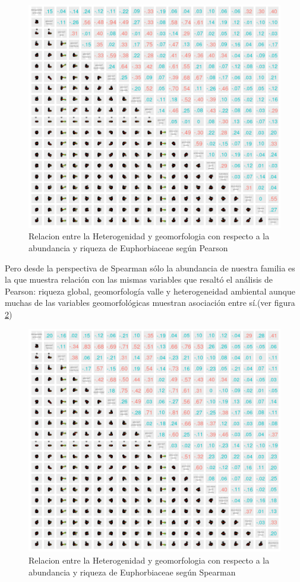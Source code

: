 \documentclass[11pt,]{article}
\begin{document}
\begin{figure}
\centering
\includegraphics{geo_pearson.png}
\caption{\label{fig:geo_pearson} Relacion entre la Heterogenidad y
geomorfologia con respecto a la abundancia y riqueza de Euphorbiaceae
según Pearson}
\end{figure}

Pero desde la perspectiva de Spearman sólo la abundancia de nuestra
familia es la que muestra relación con las mismas variables que resaltó
el análisis de Pearson: riqueza global, geomorfología valle y
heterogeneidad ambiental aunque muchas de las variables geomorfológicas
muestran asociación entre sí.(ver figura \ref{fig:spearman})

\begin{figure}
\centering
\includegraphics{spearman.png}
\caption{\label{fig:spearman}Relacion entre la Heterogenidad y
geomorfologia con respecto a la abundancia y riqueza de Euphorbiaceae
según Spearman}
\end{figure}
\end{document}
